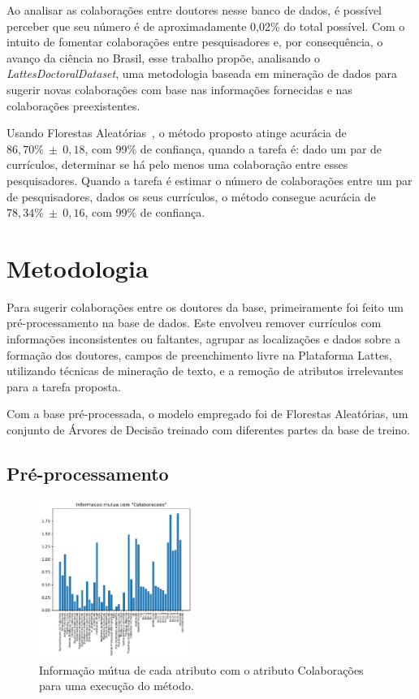 \documentclass[12pt]{article}
\begin{document}
Ao analisar as colaborações entre doutores nesse banco de dados, é possível perceber que seu número é de aproximadamente 0,02\% do total possível.
Com o intuito de fomentar colaborações entre pesquisadores e, por consequência, o avanço da ciência no Brasil, esse trabalho propõe, analisando o \emph{LattesDoctoralDataset}, uma metodologia baseada em mineração de dados para sugerir novas colaborações com base nas informações fornecidas e nas colaborações preexistentes.

Usando Florestas Aleatórias~\cite{random-forests}, o método proposto atinge acurácia de $86,70\%~\pm~0,18$, com 99\% de confiança, quando a tarefa é: dado um par de currículos, determinar se há pelo menos uma colaboração entre esses pesquisadores.
Quando a tarefa é estimar o número de colaborações entre um par de pesquisadores, dados os seus currículos, o método consegue acurácia de $78,34\%~\pm~0,16$, com 99\% de confiança.

\section{Metodologia}
\label{sec:methods}

Para sugerir colaborações entre os doutores da base, primeiramente foi feito um pré-processamento na base de dados.
Este envolveu remover currículos com informações inconsistentes ou faltantes, agrupar as localizações e dados sobre a formação dos doutores, campos de preenchimento livre na Plataforma Lattes, utilizando técnicas de mineração de texto, e a remoção de atributos irrelevantes para a tarefa proposta.

Com a base pré-processada, o modelo empregado foi de Florestas Aleatórias, um conjunto de Árvores de Decisão treinado com diferentes partes da base de treino.

\subsection{Pré-processamento}
\label{sec:preprocess}

\begin{figure}
  \centering
  \includegraphics[width=0.45\textwidth]{graphs/mutual_information.pdf}
  \vspace{-15pt}
  \caption{Informação mútua de cada atributo com o atributo Colaborações para uma execução do método.}
  \label{fig:mutual-info}
\end{figure}
\end{document}

